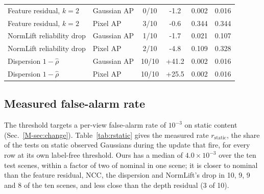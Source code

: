 \documentclass[journal]{IEEEtran}
\newcommand{\secref}[1]{Sec.~\mbox{\ref{#1}}}       %
\begin{document}
\begin{table}[t]
\begin{tabular}{@{}llcccc@{}}
Feature residual, $k=2$ & Gaussian AP & 0/10 & -1.2 & 0.002 & 0.016\\
Feature residual, $k=2$ & Pixel AP & 3/10 & -0.6 & 0.344 & 0.344\\
NormLift reliability drop & Gaussian AP & 1/10 & -1.7 & 0.021 & 0.107\\
NormLift reliability drop & Pixel AP & 2/10 & -4.8 & 0.109 & 0.328\\
Dispersion $1-\hat\rho$ & Gaussian AP & 10/10 & +41.2 & 0.002 & 0.016\\
Dispersion $1-\hat\rho$ & Pixel AP & 10/10 & +25.5 & 0.002 & 0.016\\
\bottomrule
\end{tabular}
\end{table}

\subsection{Measured false-alarm rate}
\label{supp:rstatic}
The threshold targets a per-view false-alarm rate of $10^{-3}$ on static content (\secref{M-sec:change}). Table~\ref{tab:rstatic} gives the measured rate $r_{\mathrm{static}}$, the share of the tests on static observed Gaussians during the update that fire, for every row at its own label-free threshold. Ours has a median of $4.0\times10^{-3}$ over the ten test scenes, within a factor of two of nominal in one scene; it is closer to nominal than the feature residual, NCC, the dispersion and NormLift's drop in 10, 9, 9 and 8 of the ten scenes, and less close than the depth residual (3 of 10).
\end{document}
